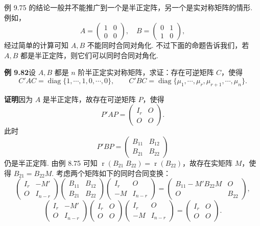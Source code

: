 \documentclass[UTF8, 12pt, fontset=fandol, oneside]{ctexart}
\begin{document}
例 9.75 的结论一般并不能推广到一个是半正定阵，另一个是实对称矩阵的情形. 例如，
\[
A=\begin{pmatrix}1&0\\0&0\end{pmatrix},\quad
B=\begin{pmatrix}0&1\\1&0\end{pmatrix},
\]
经过简单的计算可知 $A,B$ 不能同时合同对角化. 不过下面的命题告诉我们，若 $A,B$ 都是半正定阵，则它们可以同时合同对角化.

\noindent\textbf{例 9.82}\quad 设 $A,B$ 都是 $n$ 阶半正定实对称矩阵，求证：存在可逆矩阵 $C$，使得
\[
C'AC=\operatorname{diag}\{1,\cdots,1,0,\cdots,0\},\qquad
C'BC=\operatorname{diag}\{\mu_1,\cdots,\mu_r,\mu_{r+1},\cdots,\mu_n\}.
\]

\noindent\textbf{证明}\quad 因为 $A$ 是半正定阵，故存在可逆矩阵 $P$，使得
\[
P'AP=\begin{pmatrix}
I_r&O\\
O&O
\end{pmatrix}.
\]
此时
\[
P'BP=\begin{pmatrix}
B_{11}&B_{12}\\
B_{21}&B_{22}
\end{pmatrix}
\]
仍是半正定阵. 由例 8.75 可知 $\operatorname{r}(B_{21}\;B_{22})=\operatorname{r}(B_{22})$，故存在实矩阵 $M$，使得 $B_{21}=B_{22}M$. 考虑两个矩阵如下的同时合同变换：
\[
\begin{pmatrix}
I_r&-M'\\
O&I_{n-r}
\end{pmatrix}
\begin{pmatrix}
B_{11}&B_{12}\\
B_{21}&B_{22}
\end{pmatrix}
\begin{pmatrix}
I_r&O\\
-M&I_{n-r}
\end{pmatrix}
=
\begin{pmatrix}
B_{11}-M'B_{22}M&O\\
O&B_{22}
\end{pmatrix},
\]
\[
\begin{pmatrix}
I_r&-M'\\
O&I_{n-r}
\end{pmatrix}
\begin{pmatrix}
I_r&O\\
O&O
\end{pmatrix}
\begin{pmatrix}
I_r&O\\
-M&I_{n-r}
\end{pmatrix}
=
\begin{pmatrix}
I_r&O\\
O&O
\end{pmatrix}.
\]
\end{document}
